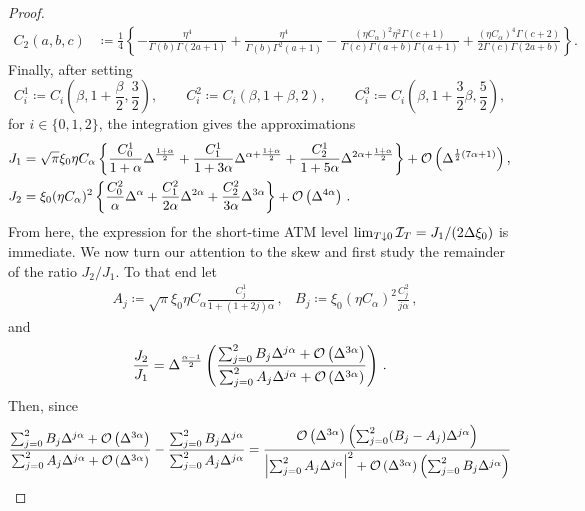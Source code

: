 \begin{proof}
\begin{equation}
\begin{aligned}
    C_2(a,b,c) &\coloneqq \frac14 \left\{ -\frac{\eta^4}{\Gamma(b)\Gamma(2a+1)} +\frac{\eta^4}{\Gamma(b)\Gamma^2(a+1)} - \frac{(\eta C_{\alpha})^2 \eta^2 \Gamma(c+1)}{\Gamma(c)\Gamma(a+b)\Gamma(a+1)} + \frac{(\eta C_{\alpha})^4 \Gamma(c+2)}{2\Gamma(c)\Gamma(2a+b)}\right\}.
\end{aligned}
\end{equation}
Finally, after setting
\begin{equation}\label{eq:C_ATMSkewTaylor}
    C_i^1 \coloneqq C_i\left(\beta, 1+\frac\beta2, \frac32\right), \qquad
        C_i^2 \coloneqq C_i\left(\beta, 1+\beta, 2\right),\qquad
        C_i^3 \coloneqq C_i\left(\beta, 1+\frac32\beta, \frac52\right),
\end{equation}
for $i\in\{0,1,2\}$, the integration gives the approximations
\begin{align*}
    J_1 &= \sqrt{\pi} \xi_0 \eta C_{\alpha} \left\{ \frac{C_0^1}{1+\alpha} 
 \Delta^{\frac{1+\alpha}{2}} + \frac{C_1^1}{1+3\alpha} 
 \Delta^{\alpha+\frac{1+\alpha}{2}}  + \frac{C_2^1}{1+5\alpha} 
 \Delta^{2\alpha+\frac{1+\alpha}{2}}\right\} + \mathcal{O}\left(\Delta^{\frac12(7\alpha+1)}\right), \\
    J_2 &= \xi_0 (\eta C_{\alpha})^2 \left\{ \frac{C_0^2}{\alpha} 
 \Delta^{\alpha} + \frac{C_1^2}{2\alpha} 
 \Delta^{2\alpha}  + \frac{C_2^2}{3\alpha} 
 \Delta^{3\alpha}\right\} + \mathcal{O}\left(\Delta^{4\alpha}\right)\,.
\end{align*}
From here, the expression for the short-time ATM level $\lim_{T\downarrow 0}\mathcal{I}_T=J_1/(2\Delta \xi_0)$ is immediate. We now turn our attention to the skew and first study the remainder of the ratio $J_2/J_1$. To that end let 
\begin{align}\label{eq:AB_ATMSkewTaylor}
& A_j \coloneqq \sqrt{\pi} \xi_0 \eta C_{\alpha} \frac{C^1_{j}}{1+(1+2j)\alpha}\,, & B_j \coloneqq \xi_0 (\eta C_{\alpha})^2\frac{C_j^2}{j\alpha}\,,
\end{align}
and
\begin{align*}
    \frac{J_2}{J_1} = \Delta^{\frac{\alpha-1}2}\left(\frac{\sum_{j=0}^2 B_j \Delta^{j\alpha} + \mathcal{O}\left(\Delta^{3\alpha}\right)}{\sum_{j=0}^2 A_j \Delta^{j\alpha} + \mathcal{O}\left(\Delta^{3\alpha}\right)}\right)\,.
\end{align*}
Then, since
\begin{align*}
    \frac{\sum_{j=0}^2 B_j \Delta^{j\alpha} + \Oo\left(\Delta^{3\alpha}\right)}{\sum_{j=0}^2 A_j \Delta^{j\alpha} + \Oo\left(\Delta^{3\alpha}\right)} - \frac{\sum_{j=0}^2 B_j \Delta^{j\alpha}}{\sum_{j=0}^2 A_j \Delta^{j\alpha}} 
    &= \frac{\Oo\left(\Delta^{3\alpha}\right)\left(\sum_{j=0}^2 (B_j - A_j) \Delta^{j\alpha}\right)}{\left|\sum_{j=0}^2 A_j \Delta^{j\alpha}\right|^2 + \Oo\left(\Delta^{3\alpha}\right)\left(\sum_{j=0}^2 B_j \Delta^{j\alpha}\right)} \\

\end{align*}
\end{proof}
